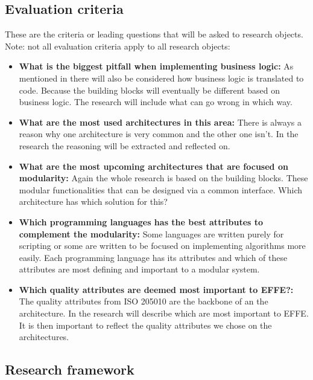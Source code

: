 \subsection{Evaluation criteria}
These are the criteria or leading questions that will be asked to research objects. Note: not all evaluation criteria apply to all research objects:

\begin{itemize}
	\item \textbf{What is the biggest pitfall when implementing business logic: }As mentioned in  there will also be considered how business logic is translated to code. Because the building blocks will eventually be different based on business logic. The research will include what can go wrong in which way.
	
	\item \textbf{What are the most used architectures in this area: }There is always a reason why one architecture is very common and the other one isn't. In the research the reasoning will be extracted and reflected on.
	
	\item \textbf{What are the most upcoming architectures that are focused on modularity: }Again the whole research is based on the building blocks. These modular functionalities that can be designed via a common interface. Which architecture has which solution for this?
	
	\item \textbf{Which programming languages has the best attributes to complement the modularity: }Some languages are written purely for scripting or some are written to be focused on implementing algorithms more easily. Each programming language has its attributes and which of these attributes are most defining and important to a modular system.
	
	\item \textbf{Which quality attributes are deemed most important to EFFE?: }The quality attributes from ISO 205010 \cite{iso25010} are the backbone of an the architecture. In the research will describe which are most important to EFFE. It is then important to reflect the quality attributes we chose on the architectures.
\end{itemize}

\subsection{Research framework}

